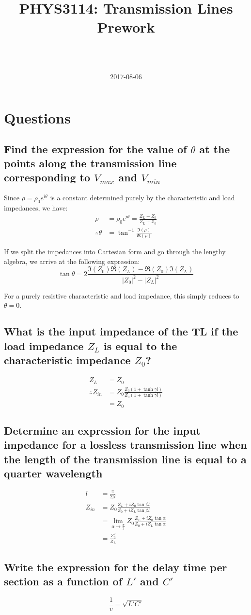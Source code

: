 \documentclass[a4paper]{scrartcl}
\begin{document}
\title{PHYS3114: Transmission Lines Prework}
\author{ \\ \\ }
\date{2017-08-06}
\maketitle

\section{Questions}
\subsection{Find the expression for the value of \(\theta\) at the points along the transmission line corresponding to \(V_{max}\) and \(V_{min}\)}
Since \(\rho = \rho_0 e^{i \theta}\) is a constant determined purely by the characteristic and load impedances, we have:
\begin{align*}
    \rho &= \rho_0 e^{i \theta} = \frac{Z_L - Z_0}{Z_L + Z_0} \\
    \therefore \theta &= \tan^{-1} \frac{\Im(\rho)}{\Re(\rho)}
\end{align*}

If we split the impedances into Cartesian form and go through the lengthy algebra, we arrive at the following expression:
\[\tan \theta = 2 \frac{\Im(Z_0) \Re(Z_L) - \Re(Z_0) \Im(Z_L)}{|Z_0|^2 - |Z_L|^2}\]

For a purely resistive characteristic and load impedance, this simply reduces to \(\theta = 0\).

\subsection{What is the input impedance of the TL if the load impedance \(Z_L\) is equal to the characteristic impedance \(Z_0\)?}
\begin{align*}
    Z_L &= Z_0 \\
    \therefore Z_{in} &= Z_0 \frac{Z_0 (1 + \tanh \gamma l)}{Z_0 (1 + \tanh \gamma l)} \\
    &= Z_0
\end{align*}

\subsection{Determine an expression for the input impedance for a lossless transmission line when the length of the transmission line is equal to a quarter wavelength}
\begin{align*}
    l &= \frac{\pi}{2 \beta} \\
    Z_{in} &= Z_0 \frac{Z_L + i Z_0 \tan \beta l}{Z_0 + i Z_L \tan \beta l} \\
    &= \lim_{\alpha \to \frac{\pi}{2}} Z_0 \frac{Z_L + i Z_0 \tan \alpha}{Z_0 + i Z_L \tan \alpha} \\
    &= \frac{Z_0^2}{Z_L}
\end{align*}

\subsection{Write the expression for the delay time per section as a function of \(L'\) and \(C'\)}
\[\frac{1}{v} = \sqrt{L' C'}\]
\end{document}
